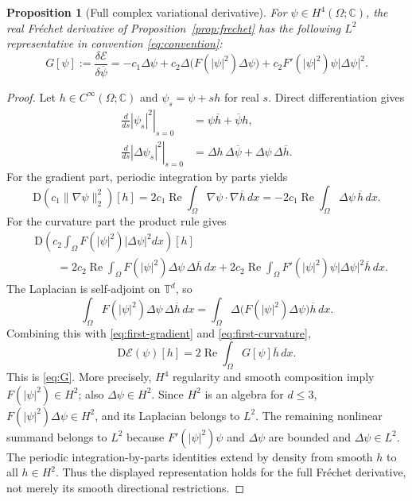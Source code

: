 \documentclass[11pt]{article}
\newtheorem{proposition}{Proposition}
\newcommand{\Om}{\Omega}
\newcommand{\EE}{\mathcal E}
\newcommand{\CC}{\mathbb C}
\newcommand{\DD}{\mathrm D}
\newcommand{\Rea}{\operatorname{Re}}
\begin{document}
\begin{proposition}[Full complex variational derivative]\label{prop:variation}
For $\psi\in H^4(\Om;\CC)$, the real Fr\'echet derivative of
Proposition~\ref{prop:frechet} has the following $L^2$ representative in
convention \eqref{eq:convention}:
\begin{equation}\label{eq:G}
\boxed{\displaystyle
 G[\psi]:=\frac{\delta\EE}{\delta\overline\psi}
   =-c_1\Delta\psi
     +c_2\Delta\!\bigl(F(|\psi|^2)\Delta\psi\bigr)
     +c_2F'(|\psi|^2)\psi|\Delta\psi|^2 .}
\end{equation}
\end{proposition}
\begin{proof}
Let $h\in C^\infty(\Om;\CC)$ and $\psi_s=\psi+sh$ for real $s$.
Direct differentiation gives
\begin{align}
 \left.\frac{d}{ds}|\psi_s|^2\right|_{s=0}
 &=\psi\overline h+\overline\psi h,\\
 \left.\frac{d}{ds}|\Delta\psi_s|^2\right|_{s=0}
 &=\Delta h\,\Delta\overline\psi
   +\Delta\psi\,\Delta\overline h.
\end{align}
For the gradient part, periodic integration by parts yields
\begin{equation}\label{eq:first-gradient}
 \DD\!\left(c_1\|\nabla\psi\|_2^2\right)[h]
 =2c_1\Rea\int_\Om \nabla\psi\cdot\nabla\overline h\,dx
 =-2c_1\Rea\int_\Om\Delta\psi\,\overline h\,dx.
\end{equation}
For the curvature part the product rule gives
\begin{align}
 &\DD\!\left(c_2\int_\Om F(|\psi|^2)|\Delta\psi|^2dx\right)[h]
 \nonumber\\
 &\qquad=2c_2\Rea\int_\Om
     F(|\psi|^2)\Delta\psi\,\Delta\overline h\,dx
 +2c_2\Rea\int_\Om
     F'(|\psi|^2)\psi|\Delta\psi|^2\overline h\,dx.
 \label{eq:first-curvature}
\end{align}
The Laplacian is self-adjoint on $\mathbb T^d$, so
\begin{equation}
 \int_\Om F(|\psi|^2)\Delta\psi\,\Delta\overline h\,dx
 =\int_\Om
   \Delta\!\bigl(F(|\psi|^2)\Delta\psi\bigr)
   \overline h\,dx.
\end{equation}
Combining this with \eqref{eq:first-gradient} and
\eqref{eq:first-curvature},
\begin{equation}
 \DD\EE(\psi)[h]=2\Rea\int_\Om G[\psi]\overline h\,dx.
\end{equation}
This is \eqref{eq:G}. More precisely, $H^4$ regularity and
smooth composition imply $F(|\psi|^2)\in H^2$; also
$\Delta\psi\in H^2$. Since $H^2$ is an algebra for $d\le3$,
$F(|\psi|^2)\Delta\psi\in H^2$, and its Laplacian belongs to $L^2$.
The remaining nonlinear summand belongs to $L^2$ because
$F'(|\psi|^2)\psi$ and $\Delta\psi$ are bounded and
$\Delta\psi\in L^2$. The periodic integration-by-parts identities
extend by density from smooth $h$ to all $h\in H^2$.
Thus the displayed representation holds for the full Fr\'echet
derivative, not merely its smooth directional restrictions.
\end{proof}
\end{document}
